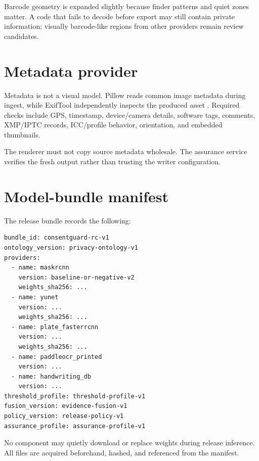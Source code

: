 Barcode geometry is expanded slightly because finder patterns and quiet zones matter. A code that fails to decode before export may still contain private information; visually barcode-like regions from other providers remain review candidates.

\section{Metadata provider}

Metadata is not a visual model. Pillow reads common image metadata during ingest, while ExifTool independently inspects the produced asset \citep{exiftool}. Required checks include GPS, timestamp, device/camera details, software tags, comments, XMP/IPTC records, ICC/profile behavior, orientation, and embedded thumbnails.

The renderer must not copy source metadata wholesale. The assurance service verifies the fresh output rather than trusting the writer configuration.

\section{Model-bundle manifest}

The release bundle records the following:

\begin{lstlisting}[language={},caption={Conceptual release-bundle manifest.}]
bundle_id: consentguard-rc-v1
ontology_version: privacy-ontology-v1
providers:
  - name: maskrcnn
    version: baseline-or-negative-v2
    weights_sha256: ...
  - name: yunet
    version: ...
    weights_sha256: ...
  - name: plate_fasterrcnn
    version: ...
    weights_sha256: ...
  - name: paddleocr_printed
    version: ...
  - name: handwriting_db
    version: ...
threshold_profile: threshold-profile-v1
fusion_version: evidence-fusion-v1
policy_version: release-policy-v1
assurance_profile: assurance-profile-v1
\end{lstlisting}

No component may quietly download or replace weights during release inference. All files are acquired beforehand, hashed, and referenced from the manifest.

